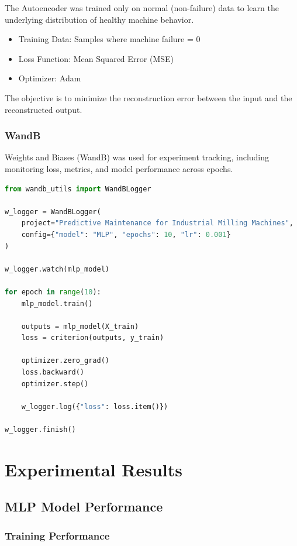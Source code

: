 \documentclass{ecsproject}     %
\begin{document}
The Autoencoder was trained only on normal (non-failure) data to learn the underlying distribution of healthy machine behavior.

\begin{itemize}
    \item Training Data: Samples where machine failure = 0
    \item Loss Function: Mean Squared Error (MSE)
    \item Optimizer: Adam
\end{itemize}

The objective is to minimize the reconstruction error between the input and the reconstructed output.

\subsection{WandB}
Weights and Biases (WandB) was used for experiment tracking, including monitoring loss, metrics, and model performance across epochs.
\begin{lstlisting}[language=Python, caption=WandB Integration for Experiment Tracking]
from wandb_utils import WandBLogger

w_logger = WandBLogger(
    project="Predictive Maintenance for Industrial Milling Machines",
    config={"model": "MLP", "epochs": 10, "lr": 0.001}
)

w_logger.watch(mlp_model)

for epoch in range(10):
    mlp_model.train()

    outputs = mlp_model(X_train)
    loss = criterion(outputs, y_train)

    optimizer.zero_grad()
    loss.backward()
    optimizer.step()

    w_logger.log({"loss": loss.item()})

w_logger.finish()
\end{lstlisting}

\chapter{Experimental Results}

\section{MLP Model Performance}

\subsection{Training Performance}
\end{document}
